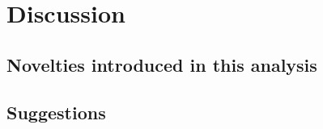 \chapter{Discussion}
\label{chap:discussion}

\section{Novelties introduced in this analysis}
\label{sec:discussion_novelties}

\section{Suggestions}
\label{sec:discussion_suggestions}
